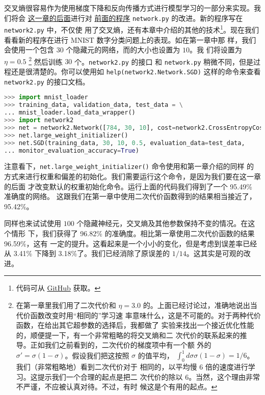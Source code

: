 交叉熵很容易作为使用梯度下降和反向传播方式进行模型学习的一部分来实现。我们将会%
\hyperref[sec:handwriting_recognition_revisited_the_code]{这一章的后面}进行对
\hyperref[sec:implementing_our_network_to_classify_digits]{前面的程序}
\lstinline!network.py! 的改进。新的程序写在 \lstinline!network2.py!  中，不仅使
用了交叉熵，还有本章中介绍的其他的技术\footnote{代码可从
  \href{https://github.com/mnielsen/neural-networks-and-deep-learning/blob/master/src/network2.py}{GitHub}
  获取。}。现在我们看看新的程序在进行 MNIST 数字分类问题上的表现。如在第一章中那
样，我们会使用一个包含 $30$ 个隐藏元的网络，而\minibatch{}的大小也设置为 $10$。我
们将\learningrate{}设置为 $\eta=0.5$ \footnote{在第一章里我们用了二次代价和 $\eta =
  3.0$ 的\learningrate{}。上面已经讨论过，准确地说出当代价函数改变时用``相同的''学习速
  率意味什么，这是不可能的。对于两种代价函数，在给出其它超参数的选择后，我都做了
  实验来找出一个接近优化性能的\learningrate{}，顺便提一下，有一个非常粗略的将交叉熵和二
  次代价的\learningrate{}联系起来的推导。正如我们之前看到的，二次代价的梯度项中有一个额
  外的 $\sigma' = \sigma(1-\sigma)$。假设我们把这按照 $\sigma$ 的值平均，
  $\int_0^1 d\sigma \sigma(1-\sigma) = 1/6$。我们（非常粗略地）看到二次代价对于
  相同的\learningrate{}，以平均慢 $6$ 倍的速度进行学习。这提示我们一个合理的起点是把二
  次代价的\learningrate{}除以 $6$。当然，这个理由非常不严谨，不应被认真对待。不过，有时
  候这是个有用的起点。} 然后训练 $30$ 个\epochs{}。\lstinline!network2.py! 的接口
和 \lstinline!network.py! 稍微不同，但是过程还是很清楚的。你可以使用如
\lstinline!help(network2.Network.SGD)! 这样的命令来查看 \lstinline!network2.py!
的接口文档。

\begin{lstlisting}[language=Python]
>>> import mnist_loader
>>> training_data, validation_data, test_data = \
... mnist_loader.load_data_wrapper()
>>> import network2
>>> net = network2.Network([784, 30, 10], cost=network2.CrossEntropyCost)
>>> net.large_weight_initializer()
>>> net.SGD(training_data, 30, 10, 0.5, evaluation_data=test_data,
... monitor_evaluation_accuracy=True)
\end{lstlisting}

注意看下，\lstinline!net.large_weight_initializer()! 命令使用和第一章介绍的同样
的方式来进行权重和偏差的初始化。我们需要运行这个命令，是因为我们要在这一章的后面
才改变默认的权重初始化命令。运行上面的代码我们得到了一个 95.49\% 准确度的网络。
这跟我们在第一章中使用二次代价函数得到的结果相当接近了，95.42\%。

同样也来试试使用 $100$ 个隐藏神经元，交叉熵及其他参数保持不变的情况。在这个情形
下，我们获得了 96.82\% 的准确度。相比第一章使用二次代价函数的结果 96.59\%，这有
一定的提升。这看起来是一个小小的变化，但是考虑到误差率已经从 3.41\% 下降到
3.18\%了。我们已经消除了原误差的 $1/14$。这其实是可观的改进。

